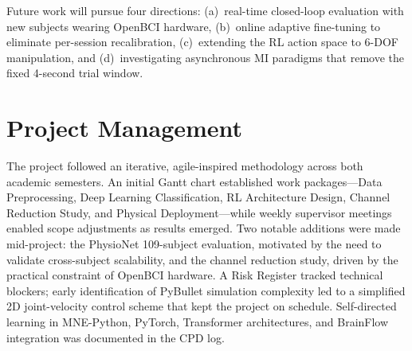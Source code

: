 \documentclass[12pt, a4paper]{article}
\begin{document}
Future work will pursue four directions: (a)~real-time closed-loop evaluation with new subjects wearing OpenBCI hardware, (b)~online adaptive fine-tuning to eliminate per-session recalibration, (c)~extending the RL action space to 6-DOF manipulation, and (d)~investigating asynchronous MI paradigms that remove the fixed 4-second trial window.

\section{Project Management}

The project followed an iterative, agile-inspired methodology across both academic semesters. An initial Gantt chart established work packages---Data Preprocessing, Deep Learning Classification, RL Architecture Design, Channel Reduction Study, and Physical Deployment---while weekly supervisor meetings enabled scope adjustments as results emerged. Two notable additions were made mid-project: the PhysioNet 109-subject evaluation, motivated by the need to validate cross-subject scalability, and the channel reduction study, driven by the practical constraint of OpenBCI hardware. A Risk Register tracked technical blockers; early identification of PyBullet simulation complexity led to a simplified 2D joint-velocity control scheme that kept the project on schedule. Self-directed learning in MNE-Python, PyTorch, Transformer architectures, and BrainFlow integration was documented in the CPD log.
\end{document}
